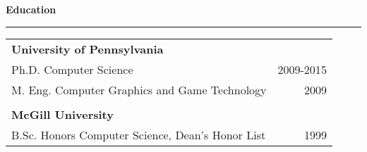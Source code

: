 {\Large {\bf Education}} 
\vspace{0.1cm}
\hrule
\medskip

\begin{tabular*}{7.1in}{@{}l@{\extracolsep\fill}r}
{\bf University of Pennsylvania} \\
Ph.D. Computer Science & 2009-2015\\
M. Eng. Computer Graphics and Game Technology & 2009 \\
\phantom{yommomma} & \phantom{2002}\\
{\bf McGill University} \\
B.Sc. Honors Computer Science, Dean's Honor List & 1999 \\
\end{tabular*}
